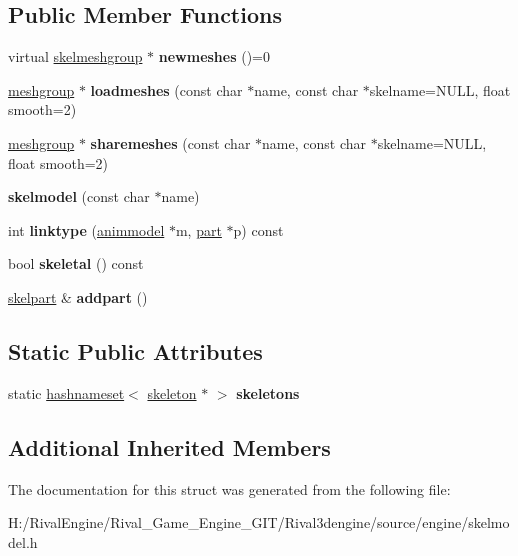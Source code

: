 \subsection*{Public Member Functions}
\begin{DoxyCompactItemize}
\item 
\mbox{\label{structskelmodel_a68b7394c9d58bd87ce14b0b5829bceca}} 
virtual \hyperlink{structskelmodel_1_1skelmeshgroup}{skelmeshgroup} $\ast$ {\bfseries newmeshes} ()=0
\item 
\mbox{\label{structskelmodel_ad4f277a05ef08b7aa5aa5b6b504a2b73}} 
\hyperlink{structanimmodel_1_1meshgroup}{meshgroup} $\ast$ {\bfseries loadmeshes} (const char $\ast$name, const char $\ast$skelname=N\+U\+LL, float smooth=2)
\item 
\mbox{\label{structskelmodel_a68ea9ba6d22573376f9d072a1c4c4b32}} 
\hyperlink{structanimmodel_1_1meshgroup}{meshgroup} $\ast$ {\bfseries sharemeshes} (const char $\ast$name, const char $\ast$skelname=N\+U\+LL, float smooth=2)
\item 
\mbox{\label{structskelmodel_a6567b6082049291155652dcd713d53d1}} 
{\bfseries skelmodel} (const char $\ast$name)
\item 
\mbox{\label{structskelmodel_a74b9d0a11d280d29f8537e3c1b2f515c}} 
int {\bfseries linktype} (\hyperlink{structanimmodel}{animmodel} $\ast$m, \hyperlink{structanimmodel_1_1part}{part} $\ast$p) const
\item 
\mbox{\label{structskelmodel_a3a6ac20403a2932a5bcb9c1505bbe583}} 
bool {\bfseries skeletal} () const
\item 
\mbox{\label{structskelmodel_a5d7ad68c024d7436c0186c33bb502026}} 
\hyperlink{structskelmodel_1_1skelpart}{skelpart} \& {\bfseries addpart} ()
\end{DoxyCompactItemize}
\subsection*{Static Public Attributes}
\begin{DoxyCompactItemize}
\item 
\mbox{\label{structskelmodel_a40d7a3698f9d48fa88fd865a6d0b3381}} 
static \hyperlink{structhashnameset}{hashnameset}$<$ \hyperlink{structskelmodel_1_1skeleton}{skeleton} $\ast$ $>$ {\bfseries skeletons}
\end{DoxyCompactItemize}
\subsection*{Additional Inherited Members}


The documentation for this struct was generated from the following file\+:\begin{DoxyCompactItemize}
\item 
H\+:/\+Rival\+Engine/\+Rival\+\_\+\+Game\+\_\+\+Engine\+\_\+\+G\+I\+T/\+Rival3dengine/source/engine/skelmodel.\+h\end{DoxyCompactItemize}
